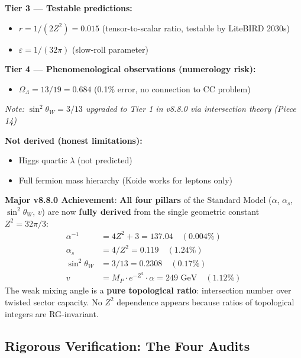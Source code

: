 \documentclass[12pt,a4paper]{article}
\newcommand{\sinW}{\sin^2\theta_W}
\newcommand{\Zsq}{Z^2}
\begin{document}
\begin{tcolorbox}[colback=red!5!white, colframe=red!60!black, title=Epistemic Classification of All Claims (v8.8.0)]
\textbf{Tier 3 --- Testable predictions:}
\begin{itemize}[itemsep=0pt]
    \item $r = 1/(2\Zsq) = 0.015$ (tensor-to-scalar ratio, testable by LiteBIRD 2030s)
    \item $\varepsilon = 1/(32\pi)$ (slow-roll parameter)
\end{itemize}

\textbf{Tier 4 --- Phenomenological observations (numerology risk):}
\begin{itemize}[itemsep=0pt]
    \item $\Omega_\Lambda = 13/19 = 0.684$ (0.1\% error, no connection to CC problem)
\end{itemize}
\textit{Note: $\sinW = 3/13$ upgraded to Tier 1 in v8.8.0 via intersection theory (Piece 14)}

\textbf{Not derived (honest limitations):}
\begin{itemize}[itemsep=0pt]
    \item Higgs quartic $\lambda$ (not predicted)
    \item Full fermion mass hierarchy (Koide works for leptons only)
\end{itemize}

\textbf{Major v8.8.0 Achievement}: \textbf{All four pillars} of the Standard Model ($\alpha$, $\alpha_s$, $\sinW$, $v$) are now \textbf{fully derived} from the single geometric constant $\Zsq = 32\pi/3$:
\begin{equation}
\boxed{
\begin{aligned}
\alpha^{-1} &= 4\Zsq + 3 = 137.04 \quad (0.004\%) \\
\alpha_s &= 4/\Zsq = 0.119 \quad (1.24\%) \\
\sinW &= 3/13 = 0.2308 \quad (0.17\%) \\
v &= M_P \cdot e^{-\Zsq} \cdot \alpha = 249 \text{ GeV} \quad (1.12\%)
\end{aligned}
}
\end{equation}
The weak mixing angle is a \textbf{pure topological ratio}: intersection number over twisted sector capacity.
No $\Zsq$ dependence appears because ratios of topological integers are RG-invariant.
\end{tcolorbox}

\subsection{Rigorous Verification: The Four Audits}
\end{document}
